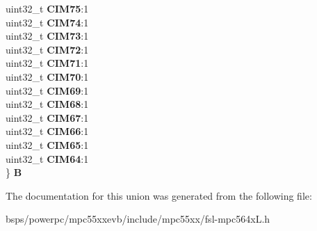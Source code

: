 \begin{DoxyCompactItemize}
\begin{tabbing}
\>uint32\_t {\bfseries CIM75}:1\\
\>uint32\_t {\bfseries CIM74}:1\\
\>uint32\_t {\bfseries CIM73}:1\\
\>uint32\_t {\bfseries CIM72}:1\\
\>uint32\_t {\bfseries CIM71}:1\\
\>uint32\_t {\bfseries CIM70}:1\\
\>uint32\_t {\bfseries CIM69}:1\\
\>uint32\_t {\bfseries CIM68}:1\\
\>uint32\_t {\bfseries CIM67}:1\\
\>uint32\_t {\bfseries CIM66}:1\\
\>uint32\_t {\bfseries CIM65}:1\\
\>uint32\_t {\bfseries CIM64}:1\\
\} {\bfseries B}\\

\end{tabbing}\end{DoxyCompactItemize}


The documentation for this union was generated from the following file\+:\begin{DoxyCompactItemize}
\item 
bsps/powerpc/mpc55xxevb/include/mpc55xx/fsl-\/mpc564x\+L.\+h\end{DoxyCompactItemize}
